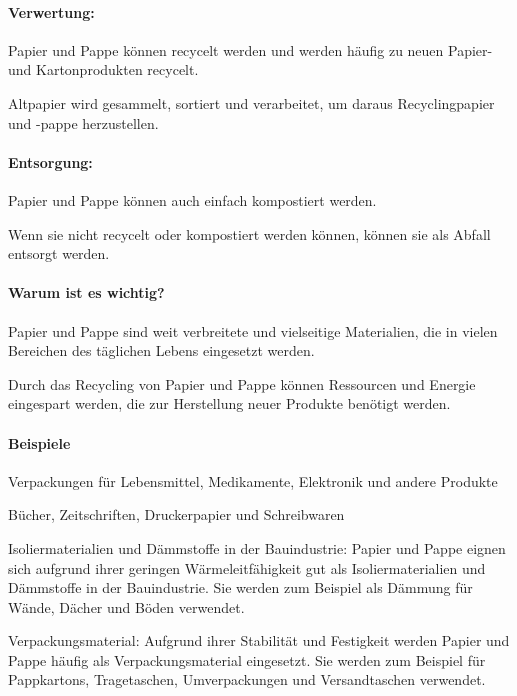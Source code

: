 \documentclass{article}
\begin{document}
\begin{multicols}{3}
\paragraph{Verwertung:}
\begin{compactitem}
\item Papier und Pappe können recycelt werden und werden häufig zu neuen
  Papier- und Kartonprodukten recycelt.
\item Altpapier wird gesammelt, sortiert und verarbeitet, um daraus
  Recyclingpapier und -pappe herzustellen.
\end{compactitem}

\paragraph{Entsorgung:}
\begin{compactitem}
\item Papier und Pappe können auch einfach kompostiert werden.
\item Wenn sie nicht recycelt oder kompostiert werden können, können sie als
  Abfall entsorgt werden.
\end{compactitem}

\paragraph{Warum ist es wichtig?}
\begin{compactitem}
\item Papier und Pappe sind weit verbreitete und vielseitige Materialien, die
  in vielen Bereichen des täglichen Lebens eingesetzt werden.
\item Durch das Recycling von Papier und Pappe können Ressourcen und Energie
  eingespart werden, die zur Herstellung neuer Produkte benötigt werden.
\end{compactitem}

\paragraph{Beispiele}
\begin{compactitem}
\item Verpackungen für Lebensmittel, Medikamente, Elektronik und andere
  Produkte
\item Bücher, Zeitschriften, Druckerpapier und Schreibwaren
\item Isoliermaterialien und Dämmstoffe in der Bauindustrie: Papier und Pappe
  eignen sich aufgrund ihrer geringen Wärmeleitfähigkeit gut als
  Isoliermaterialien und Dämmstoffe in der Bauindustrie. Sie werden zum
  Beispiel als Dämmung für Wände, Dächer und Böden verwendet.
\item Verpackungsmaterial: Aufgrund ihrer Stabilität und Festigkeit werden
  Papier und Pappe häufig als Verpackungsmaterial eingesetzt. Sie werden zum
  Beispiel für Pappkartons, Tragetaschen, Umverpackungen und Versandtaschen
  verwendet.
\end{compactitem}
\end{multicols}
\end{document}
